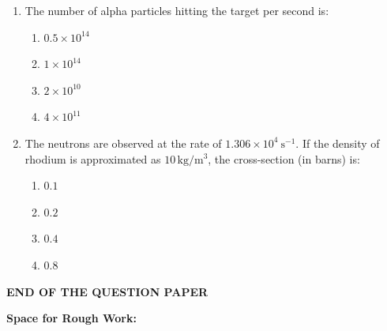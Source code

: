 \documentclass[journal,13pt,onecolumn]{IEEEtran}
\begin{document}
\begin{enumerate}[itemsep = 1em]
\item The number of alpha particles hitting the target per second is:

\hfill{}

\begin{multicols}{2}
\begin{enumerate}
    \item $0.5 \times 10^{14}$
    \item $1 \times 10^{14}$
    \item $2 \times 10^{10}$
    \item $4 \times 10^{11}$
\end{enumerate}
\end{multicols}

\item The neutrons are observed at the rate of $1.306 \times 10^4 \ \mathrm{s^{-1}}$. If the density of rhodium is approximated as $10\,\mathrm{kg/m^3}$, the cross-section (in barns) is:

\hfill{}

\begin{multicols}{2}
\begin{enumerate}
    \item $0.1$
    \item $0.2$
    \item $0.4$
    \item $0.8$
\end{enumerate}
\end{multicols}

\end{enumerate}


\begin{center}
 \textbf{END OF THE QUESTION PAPER}   
\end{center}


\vspace{2cm}
\textbf{Space for Rough Work:} \\
\end{document}

